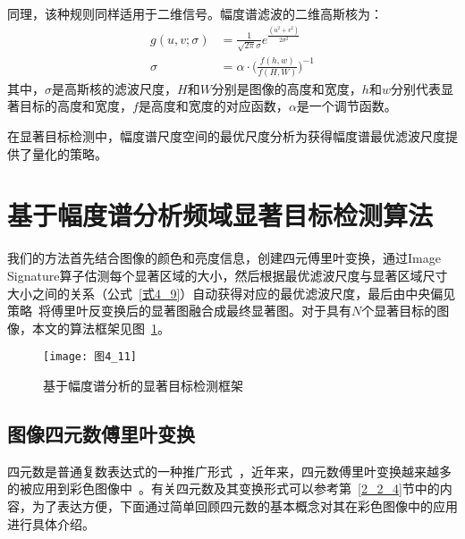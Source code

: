 同理，该种规则同样适用于二维信号。幅度谱滤波的二维高斯核为：
\begin{align}
g(u,v;\sigma) &= \frac{1}{\sqrt{2\pi}\sigma}e^{\frac{(u^{2}+v^{2})}{2\sigma^{2}}}\label{式4_8}\\
\sigma &= \alpha\cdot\Big(\frac{f(h,w)}{f(H,W)}\Big)^{-1}\label{式4_9}
\end{align}
其中，$\sigma$是高斯核的滤波尺度，$H$和$W$分别是图像的高度和宽度，$h$和$w$分别代表显著目标的高度和宽度，$f$是高度和宽度的对应函数，$\alpha$是一个调节函数。

在显著目标检测中，幅度谱尺度空间的最优尺度分析为获得幅度谱最优滤波尺度提供了量化的策略。

\section{基于幅度谱分析频域显著目标检测算法}
\label{4_2}

我们的方法首先结合图像的颜色和亮度信息，创建四元傅里叶变换，通过Image Signature算子估测每个显著区域的大小，然后根据最优滤波尺度与显著区域尺寸大小之间的关系（公式~\ref{式4_9}）自动获得对应的最优滤波尺度，最后由中央偏见策略~\cite{JuddMIT2012Benchmark}将傅里叶反变换后的显著图融合成最终显著图。对于具有$N$个显著目标的图像，本文的算法框架见图~\ref{图4_11}。
\begin{figure}[h]
  \centering
  \texttt{[image: 图4\_11]}
  \caption{基于幅度谱分析的显著目标检测框架}   
  \label{图4_11} 
\end{figure}

\subsection{图像四元数傅里叶变换}
\label{4_2_1}

四元数是普通复数表达式的一种推广形式~\cite{Hamilton1866book}，近年来，四元数傅里叶变换越来越多的被应用到彩色图像中~\cite{EllPhD1992Hypercomplex}。有关四元数及其变换形式可以参考第~\ref{2_2_4}节中的内容，为了表达方便，下面通过简单回顾四元数的基本概念对其在彩色图像中的应用进行具体介绍。

